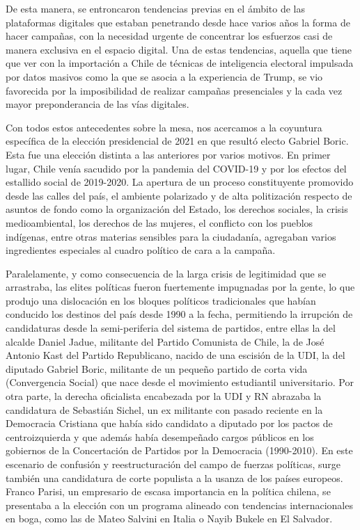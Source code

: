 \documentclass[
  10pt,
  letterpaper,
]{report}
\begin{document}
De esta manera, se entroncaron tendencias previas en el ámbito de las
plataformas digitales que estaban penetrando desde hace varios años la
forma de hacer campañas, con la necesidad urgente de concentrar los
esfuerzos casi de manera exclusiva en el espacio digital. Una de estas
tendencias, aquella que tiene que ver con la importación a Chile de
técnicas de inteligencia electoral impulsada por datos masivos como la
que se asocia a la experiencia de Trump, se vio favorecida por la
imposibilidad de realizar campañas presenciales y la cada vez mayor
preponderancia de las vías digitales.

Con todos estos antecedentes sobre la mesa, nos acercamos a la coyuntura
específica de la elección presidencial de 2021 en que resultó electo
Gabriel Boric. Esta fue una elección distinta a las anteriores por
varios motivos. En primer lugar, Chile venía sacudido por la pandemia
del COVID-19 y por los efectos del estallido social de 2019-2020. La
apertura de un proceso constituyente promovido desde las calles del
país, el ambiente polarizado y de alta politización respecto de asuntos
de fondo como la organización del Estado, los derechos sociales, la
crisis medioambiental, los derechos de las mujeres, el conflicto con los
pueblos indígenas, entre otras materias sensibles para la ciudadanía,
agregaban varios ingredientes especiales al cuadro político de cara a la
campaña.

Paralelamente, y como consecuencia de la larga crisis de legitimidad que
se arrastraba, las elites políticas fueron fuertemente impugnadas por la
gente, lo que produjo una dislocación en los bloques políticos
tradicionales que habían conducido los destinos del país desde 1990 a la
fecha, permitiendo la irrupción de candidaturas desde la semi-periferia
del sistema de partidos, entre ellas la del alcalde Daniel Jadue,
militante del Partido Comunista de Chile, la de José Antonio Kast del
Partido Republicano, nacido de una escisión de la UDI, la del diputado
Gabriel Boric, militante de un pequeño partido de corta vida
(Convergencia Social) que nace desde el movimiento estudiantil
universitario. Por otra parte, la derecha oficialista encabezada por la
UDI y RN abrazaba la candidatura de Sebastián Sichel, un ex militante
con pasado reciente en la Democracia Cristiana que había sido candidato
a diputado por los pactos de centroizquierda y que además había
desempeñado cargos públicos en los gobiernos de la Concertación de
Partidos por la Democracia (1990-2010). En este escenario de confusión y
reestructuración del campo de fuerzas políticas, surge también una
candidatura de corte populista a la usanza de los países europeos.
Franco Parisi, un empresario de escasa importancia en la política
chilena, se presentaba a la elección con un programa alineado con
tendencias internacionales en boga, como las de Mateo Salvini en Italia
o Nayib Bukele en El Salvador.
\end{document}
